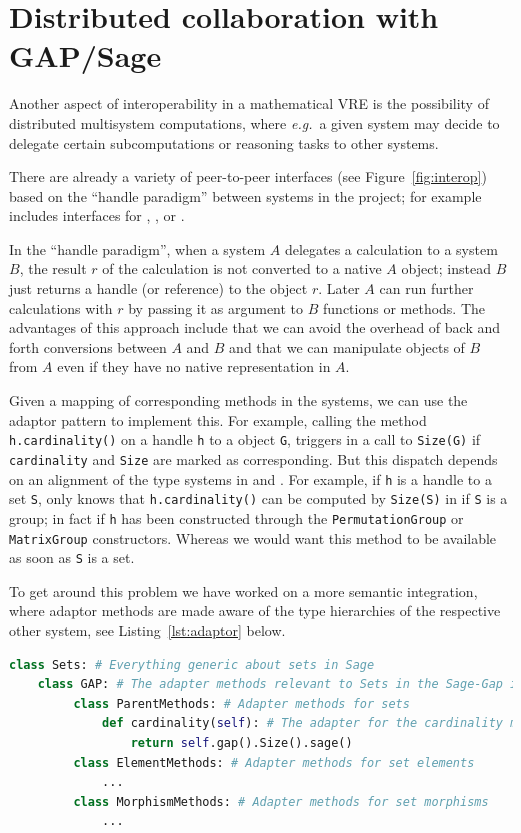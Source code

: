 \section{Distributed collaboration with GAP/Sage}\label{sec:gapsage}
\label{sec:handles}

Another aspect of interoperability in a mathematical VRE is the possibility of distributed
multisystem computations, where \emph{e.g.}\ a given system may decide to delegate
certain subcomputations or reasoning tasks to other systems.

There are already a variety of peer-to-peer interfaces (see Figure~\ref{fig:interop})
based on the ``handle paradigm'' between systems in the \ODK project;
for example \Sage includes interfaces for \GAP, \Singular, or \Pari.

In the ``handle paradigm'', when a system $A$ delegates a calculation to a system $B$, the
result $r$ of the calculation is not converted to a native $A$ object; instead $B$ just
returns a handle (or reference) to the object $r$. Later $A$ can run further calculations
with $r$ by passing it as argument to $B$ functions or methods. The advantages of this
approach include that we can avoid the overhead of back and forth conversions between $A$
and $B$ and that we can manipulate objects of $B$ from $A$ even if they have no native
representation in $A$.

Given a mapping of corresponding methods in the systems, we can use the adaptor pattern to
implement this. For example, calling the method \texttt{h.cardinality()} on a \Sage handle
\texttt{h} to a \GAP object \texttt{G}, triggers in \GAP a call to \texttt{Size(G)} if
\texttt{cardinality} and \texttt{Size} are marked as corresponding. But this dispatch
depends on an alignment of the type systems in \Sage and \GAP. For example, if \texttt{h}
is a handle to a set \texttt{S}, \Sage only knows that \texttt{h.cardinality()} can be
computed by \texttt{Size(S)} in \GAP if \texttt{S} is a group; in fact if \texttt{h} has
been constructed through the \texttt{PermutationGroup} or \texttt{MatrixGroup}
constructors. Whereas we would want this method to be available as soon as \texttt{S} is a
set.

To get around this problem we have worked on a more semantic integration, where adaptor
methods are made aware of the type hierarchies of the respective other system, see
Listing~\ref{lst:adaptor} below. 
\begin{lstlisting}[language=Python,label=lst:adaptor,
  caption=A Semantic Adaptor Method in \Sage]
class Sets: # Everything generic about sets in Sage
    class GAP: # The adapter methods relevant to Sets in the Sage-Gap interface
         class ParentMethods: # Adapter methods for sets
             def cardinality(self): # The adapter for the cardinality method
                 return self.gap().Size().sage()
         class ElementMethods: # Adapter methods for set elements
             ...
         class MorphismMethods: # Adapter methods for set morphisms
             ...
\end{lstlisting}

